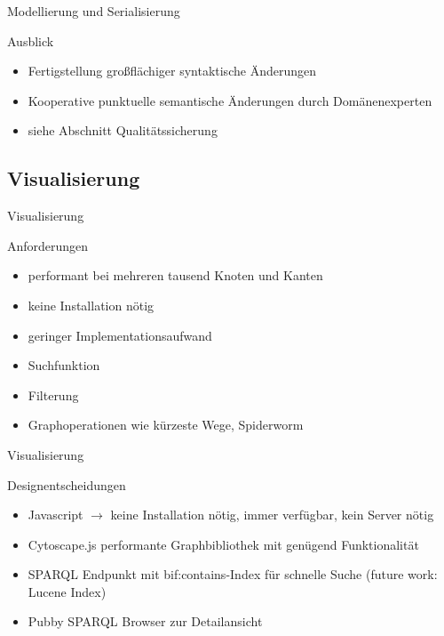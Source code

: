 \documentclass[14pt,aspectratio=1610]{beamer}
\begin{document}
\begin{frame}{Modellierung und Serialisierung}
\begin{block}{Ausblick}
\begin{itemize}
\item Fertigstellung großflächiger syntaktische Änderungen
\item Kooperative punktuelle semantische Änderungen durch Domänenexperten
\item siehe Abschnitt Qualitätssicherung 
\end{itemize}
\end{block}
\end{frame}

\subsection{Visualisierung}%

\begin{frame}{Visualisierung}
\begin{block}{Anforderungen}
\begin{itemize}
\item performant bei mehreren tausend Knoten und Kanten 
\item keine Installation nötig
\item geringer Implementationsaufwand
\item Suchfunktion
\item Filterung
\item Graphoperationen wie kürzeste Wege, Spiderworm
\end{itemize}
\end{block}
\end{frame}

\begin{frame}{Visualisierung}
\begin{block}{Designentscheidungen}
\begin{itemize}
\item Javascript $\rightarrow$ keine Installation nötig, immer verfügbar, kein Server nötig
\item Cytoscape.js performante Graphbibliothek mit genügend Funktionalität
\item SPARQL Endpunkt mit bif:contains-Index für schnelle Suche (future work: Lucene Index)
\item Pubby SPARQL Browser zur Detailansicht 
\end{itemize}
\end{block}
\end{frame}
\end{document}
